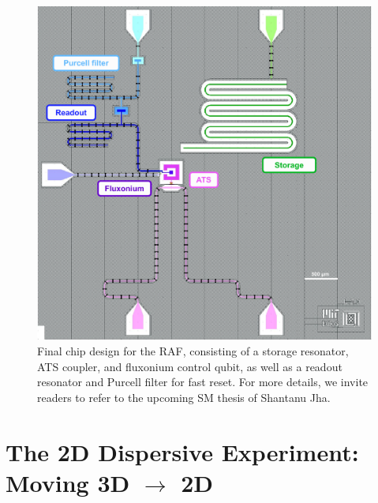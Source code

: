 \begin{figure}[h]
    \centering
    \includegraphics[width=0.7\linewidth]{Figures/5/RAF_Final_Design.pdf}
    \caption[Final GDS chip design for the RAF experiment.]{Final chip design for the RAF, consisting of a storage resonator, ATS coupler, and fluxonium control qubit, as well as a readout resonator and Purcell filter for fast reset. For more details, we invite readers to refer to the upcoming SM thesis of Shantanu Jha.}
    \label{fig:5_RAF_Final_Design}
\end{figure}

\clearpage


\section{The 2D Dispersive Experiment: Moving 3D \texorpdfstring{$\to$}{to} 2D\label{sec:5_2D_Disp}}


